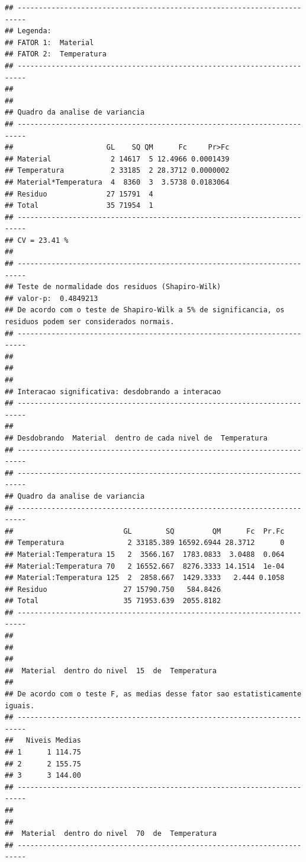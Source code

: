 \documentclass[
]{book}
\begin{document}
\begin{verbatim}
## ------------------------------------------------------------------------
## Legenda:
## FATOR 1:  Material 
## FATOR 2:  Temperatura 
## ------------------------------------------------------------------------
## 
## 
## Quadro da analise de variancia
## ------------------------------------------------------------------------
##                      GL    SQ QM      Fc     Pr>Fc
## Material              2 14617  5 12.4966 0.0001439
## Temperatura           2 33185  2 28.3712 0.0000002
## Material*Temperatura  4  8360  3  3.5738 0.0183064
## Residuo              27 15791  4                  
## Total                35 71954  1                  
## ------------------------------------------------------------------------
## CV = 23.41 %
## 
## ------------------------------------------------------------------------
## Teste de normalidade dos residuos (Shapiro-Wilk)
## valor-p:  0.4849213 
## De acordo com o teste de Shapiro-Wilk a 5% de significancia, os residuos podem ser considerados normais.
## ------------------------------------------------------------------------
## 
## 
## 
## Interacao significativa: desdobrando a interacao
## ------------------------------------------------------------------------
## 
## Desdobrando  Material  dentro de cada nivel de  Temperatura 
## ------------------------------------------------------------------------
## ------------------------------------------------------------------------
## Quadro da analise de variancia
## ------------------------------------------------------------------------
##                          GL        SQ         QM      Fc  Pr.Fc
## Temperatura               2 33185.389 16592.6944 28.3712      0
## Material:Temperatura 15   2  3566.167  1783.0833  3.0488  0.064
## Material:Temperatura 70   2 16552.667  8276.3333 14.1514  1e-04
## Material:Temperatura 125  2  2858.667  1429.3333   2.444 0.1058
## Residuo                  27 15790.750   584.8426               
## Total                    35 71953.639  2055.8182               
## ------------------------------------------------------------------------
## 
## 
## 
##  Material  dentro do nivel  15  de  Temperatura 
## 
## De acordo com o teste F, as medias desse fator sao estatisticamente iguais.
## ------------------------------------------------------------------------
##   Niveis Medias
## 1      1 114.75
## 2      2 155.75
## 3      3 144.00
## ------------------------------------------------------------------------
## 
## 
##  Material  dentro do nivel  70  de  Temperatura 
## ------------------------------------------------------------------------

\end{verbatim}
\end{document}
